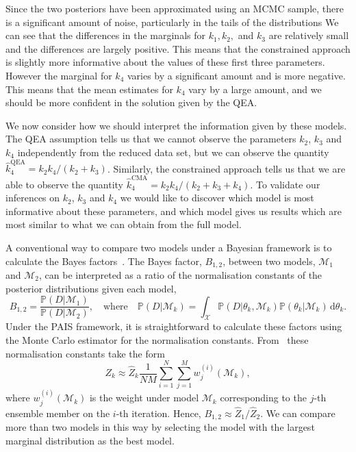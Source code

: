 \documentclass[final]{siamltex}
\begin{document}
Since the two posteriors have been approximated using an MCMC sample, there is a significant amount of noise, particularly in the tails of the distributions We can see that the differences in the marginals for $k_1, k_2,$ and $k_3$ are relatively small and the differences are largely positive. This means that the constrained approach is slightly more informative about the values of these first three parameters. However the marginal for $k_4$ varies by a significant amount and is more negative. This means that the mean estimates for $k_4$ vary by a large amount, and we should be more confident in the solution given by the QEA.

We now consider how we should interpret the information given by these models. The QEA assumption tells us that we cannot observe the parameters $k_2$, $k_3$ and $k_4$ independently from the reduced data set, but we can observe the quantity $\hat{k}_4^{\text{QEA}} = k_2k_4/(k_2+k_3)$. Similarly, the constrained approach tells us that we are able to observe the quantity $\hat{k}_4^{\text{CMA}} = k_2k_4/(k_2+k_3+k_4)$. To validate our inferences on $k_2$, $k_3$ and $k_4$ we would like to discover which model is most informative about these parameters, and which model gives us results which are most similar to what we can obtain from the full model.

A conventional way to compare two models under a Bayesian framework is to calculate the Bayes factors~\cite{chen2012monte}. The Bayes factor, $B_{1,2}$, between two models, $\mathcal{M}_1$ and $\mathcal{M}_2$, can be interpreted as a ratio of the normalisation constants of the posterior distributions given each model,
\[
	B_{1,2} = \frac{\mathbb{P}(D|\mathcal{M}_1)}{\mathbb{P}(D|\mathcal{M}_2)}, \quad \text{where} \quad \mathbb{P}(D|\mathcal{M}_k) = \int_\mathcal{X} \mathbb{P}(D|\theta_k,\mathcal{M}_k)\mathbb{P}(\theta_k|\mathcal{M}_k) \, \text{d}\theta_k.
\]
Under the PAIS framework, it is straightforward to calculate these factors using the Monte Carlo estimator for the normalisation constants. From~\cite{robert2013monte} these normalisation constants take the form
\[
	Z_k \approx \hat{Z}_k\frac{1}{NM}\sum_{i=1}^N\sum_{j=1}^M w_j^{(i)}(\mathcal{M}_k),
\]
where $w_j^{(i)}(\mathcal{M}_k)$ is the weight under model $\mathcal{M}_k$ corresponding to the $j$-th ensemble member on the $i$-th iteration. Hence, $B_{1,2} \approx \hat{Z}_1/\hat{Z}_2$. We can compare more than two models in this way by selecting the model with the largest marginal distribution as the best model.
\end{document}
